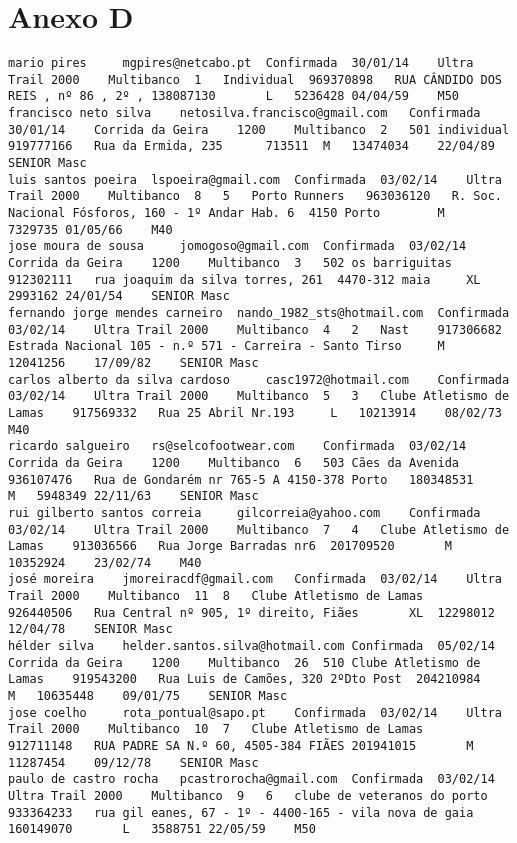 \documentclass[11pt,a4paper]{report}
\begin{document}
    \section{Anexo D}
    \hypertarget{Anexo D}{}
    \begin{verbatim}
mario pires 	mgpires@netcabo.pt	Confirmada	30/01/14	Ultra Trail	2000	Multibanco	1	Individual	969370898	RUA CÂNDIDO DOS REIS , nº 86 , 2º ,	138087130		L	5236428	04/04/59	M50	
francisco neto silva 	netosilva.francisco@gmail.com	Confirmada	30/01/14	Corrida da Geira	1200	Multibanco	2	501	individual	919777166	Rua da Ermida, 235		713511	M	13474034	22/04/89	SENIOR Masc	
luis santos poeira 	lspoeira@gmail.com	Confirmada	03/02/14	Ultra Trail	2000	Multibanco	8	5	Porto Runners	963036120	R. Soc. Nacional Fósforos, 160 - 1º Andar Hab. 6  4150 Porto		M	7329735	01/05/66	M40	
jose moura de sousa 	jomogoso@gmail.com	Confirmada	03/02/14	Corrida da Geira	1200	Multibanco	3	502	os barriguitas	912302111	rua joaquim da silva torres, 261  4470-312 maia		XL	2993162	24/01/54	SENIOR Masc	
fernando jorge mendes carneiro 	nando_1982_sts@hotmail.com	Confirmada	03/02/14	Ultra Trail	2000	Multibanco	4	2	Nast	917306682	Estrada Nacional 105 - n.º 571 - Carreira - Santo Tirso		M	12041256	17/09/82	SENIOR Masc	
carlos alberto da silva cardoso 	casc1972@hotmail.com	Confirmada	03/02/14	Ultra Trail	2000	Multibanco	5	3	Clube Atletismo de Lamas	917569332	Rua 25 Abril Nr.193		L	10213914	08/02/73	M40	
ricardo salgueiro 	rs@selcofootwear.com	Confirmada	03/02/14	Corrida da Geira	1200	Multibanco	6	503	Cães da Avenida	936107476	Rua de Gondarém nr 765-5 A 4150-378 Porto	180348531		M	5948349	22/11/63	SENIOR Masc	
rui gilberto santos correia 	gilcorreia@yahoo.com	Confirmada	03/02/14	Ultra Trail	2000	Multibanco	7	4	Clube Atletismo de Lamas	913036566	Rua Jorge Barradas nr6	201709520		M	10352924	23/02/74	M40	
josé moreira 	jmoreiracdf@gmail.com	Confirmada	03/02/14	Ultra Trail	2000	Multibanco	11	8	Clube Atletismo de Lamas	926440506	Rua Central nº 905, 1º direito, Fiães		XL	12298012	12/04/78	SENIOR Masc	
hélder silva 	helder.santos.silva@hotmail.com	Confirmada	05/02/14	Corrida da Geira	1200	Multibanco	26	510	Clube Atletismo de Lamas	919543200	Rua Luis de Camões, 320 2ºDto Post	204210984		M	10635448	09/01/75	SENIOR Masc	
jose coelho 	rota_pontual@sapo.pt	Confirmada	03/02/14	Ultra Trail	2000	Multibanco	10	7	Clube Atletismo de Lamas	912711148	RUA PADRE SA N.º 60, 4505-384 FIÃES	201941015		M	11287454	09/12/78	SENIOR Masc	
paulo de castro rocha 	pcastrorocha@gmail.com	Confirmada	03/02/14	Ultra Trail	2000	Multibanco	9	6	clube de veteranos do porto	933364233	rua gil eanes, 67 - 1º - 4400-165 - vila nova de gaia	160149070		L	3588751	22/05/59	M50	

\end{verbatim}
\end{document}
